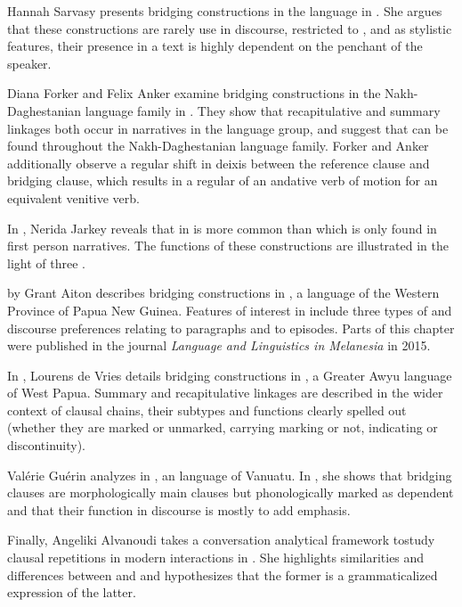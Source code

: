 \begin{refsection}
Hannah Sarvasy presents bridging constructions in the  language  in . She argues that these constructions are rarely use in  discourse, restricted to , and as stylistic features, their presence in a text is highly dependent on the penchant of the speaker. 

Diana Forker and Felix Anker examine bridging constructions in the Nakh-Daghestanian language family in . They show that recapitulative and summary linkages both occur in narratives in the  language group, and suggest that  can be found throughout the Nakh-Daghestanian language family. Forker and Anker additionally observe a regular shift in deixis between the reference clause and bridging clause, which results in a regular  of an andative verb of motion for an equivalent venitive verb. 

In , Nerida Jarkey reveals that in   is more common than  which is only found in first person narratives. The functions of these constructions are illustrated in the light of three . 

 by Grant Aiton describes bridging constructions in , a language of the Western Province of Papua New Guinea. Features of interest in  include three types of  and discourse preferences relating  to paragraphs and  to episodes. Parts of this chapter were published in the journal \textit{Language and Linguistics in Melanesia} in 2015. 

In , Lourens de Vries details bridging constructions in , a Greater Awyu language of West Papua. Summary and recapitulative linkages are described in the wider context of clausal chains, their subtypes and functions clearly spelled out (whether they are marked or unmarked, carrying  marking or not, indicating  or discontinuity). 

Valérie Guérin analyzes  in , an  language of Vanuatu. In , she shows that bridging clauses are morphologically main clauses but phonologically marked as dependent and that their function in discourse is mostly to add emphasis. 

Finally, Angeliki Alvanoudi takes a conversation analytical framework to\linebreak study clausal repetitions in modern  interactions in . She highlights similarities and differences between  and  and hypothesizes that the former is a grammaticalized expression of the latter. 




\end{refsection}
